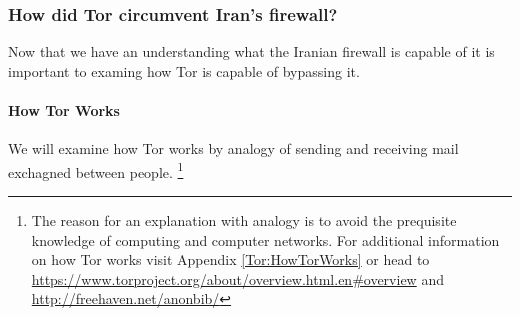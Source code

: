 \documentclass[11pt]{article}
\begin{document}
\begin{multicols}{2}


\subsubsection{How did Tor circumvent Iran's firewall?}

Now that we have an understanding what the Iranian firewall is capable of it is
important to examing how Tor is capable of bypassing it.

\paragraph{How Tor Works}
\label{HowTorWorks}
We will examine how Tor works by analogy of sending and receiving mail 
exchagned between people. 
\footnote{The reason for an explanation with analogy is to avoid the prequisite
  knowledge of computing and computer networks. For additional information on how 
  Tor works visit Appendix \ref{Tor:HowTorWorks} or head to
  \url{https://www.torproject.org/about/overview.html.en#overview} and
\url{http://freehaven.net/anonbib/}
}


\end{multicols}
\end{document}
